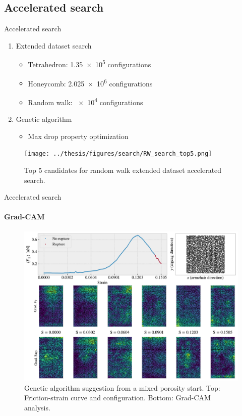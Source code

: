 \documentclass[
	10pt, %
]{beamer}
\begin{document}
\subsection{Accelerated search}
\begin{frame}{Accelerated search}
	\begin{enumerate}
		\item Extended dataset search
		\begin{itemize}
			\item Tetrahedron: \num{1.35e5} configurations 
			\item Honeycomb: \num{2.025e6} configurations
			\item Random walk: \num{e4} configurations
		\end{itemize}
		\item Genetic algorithm
		\begin{itemize}
			\item Max drop property optimization 
		\end{itemize}
	\end{enumerate}

	\begin{figure}[H]
		\centering
		\texttt{[image: ../thesis/figures/search/RW\_search\_top5.png]}
		\caption{Top 5 candidates for random walk extended dataset accelerated search. }
	\end{figure}  
\end{frame}
%
%
\begin{frame}{Accelerated search}
	\framesubtitle{Grad-CAM}
	\begin{figure}[H]
		\centering
		\includegraphics[width=0.7\linewidth]{../thesis/figures/search/grad_cam_GA_RN_start_top0.pdf}
		\caption{Genetic algorithm suggestion from a mixed porosity start. Top: Friction-strain curve and configuration. Bottom: Grad-CAM analysis.}
	\end{figure}  
\end{frame}
\end{document}
